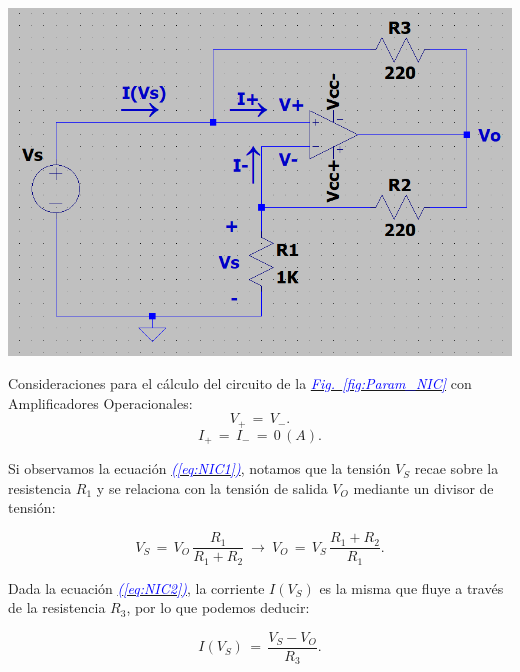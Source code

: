 \documentclass[12pt,a4paper]{report} %
\newcommand{\fref}[1]{\hyperref[#1]{\textcolor{blue}{\textit{Fig.~\ref*{#1}}}}}
\newcommand{\eref}[1]{\hyperref[#1]{\textcolor{blue}{\textit{(\ref*{#1})}}}}
\begin{document}
	\begin{center}
	\begin{multicols}{2}
		\centering
		\includegraphics[width=\columnwidth]{demotracion_NIC.png}
		\label{fig:Param_NIC}
	
		\columnbreak
		
		Consideraciones para el cálculo del circuito de la \fref{fig:Param_NIC} con Amplificadores Operacionales:\\
		\begin{equation}
			V_+\,=\,V_-.
			\label{eq:NIC1}
		\end{equation}
		\begin{equation}
			I_+\,=\,I_-\,=\,0\,(A).
			\label{eq:NIC2}
		\end{equation}
	\end{multicols}
	\end{center}
	
	\noindent Si observamos la ecuación \eref{eq:NIC1}, notamos que la tensión $V_S$ recae sobre la resistencia $R_1$ y se relaciona con la tensión de salida $V_O$ mediante un divisor de tensión:
	
	\begin{equation}
		V_S\,=\,V_O\,\frac{R_1}{R_1 + R_2}\:\longrightarrow\:V_O\,=\,V_S\,\frac{R_1 + R_2}{R_1}.
		\label{eq:NIC3}
	\end{equation}\smallskip
	
	\noindent Dada la ecuación \eref{eq:NIC2}, la corriente $I(V_S)$ es la misma que fluye a través de la resistencia $R_3$, por lo que podemos deducir:
	
	\begin{equation}
		I(V_S)\,=\,\frac{V_S - V_O}{R_3}.
		\label{eq:NIC4}
	\end{equation}\smallskip
	
\end{document}
